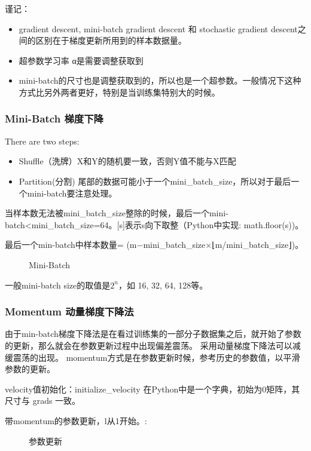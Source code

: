 \documentclass[UTF8]{ctexart}
\begin{document}
谨记：
\begin{itemize}
  \item gradient descent, mini-batch gradient descent 和 stochastic gradient descent之间的区别在于梯度更新所用到的样本数据量。
\item 超参数学习率 α是需要调整获取到
\item mini-batch的尺寸也是调整获取到的，所以也是一个超参数。一般情况下这种方式比另外两者更好，特别是当训练集特别大的时候。
\end{itemize}

\subsubsection{Mini-Batch 梯度下降}
There are two steps:
\begin{itemize}
  \item Shuffle（洗牌）X和Y的随机要一致，否则Y值不能与X匹配
  \item Partition(分割) 尾部的数据可能小于一个mini\_batch\_size，所以对于最后一个mini-batch要注意处理。
\end{itemize}

当样本数无法被mini\_batch\_size整除的时候，最后一个mini-batch<mini\_batch\_size=64。[s]表示s向下取整（Python中实现:
math.floor(s))。

最后一个min-batch中样本数量= (m−mini\_batch\_size×⌊m/mini\_batch\_size⌋)。
\begin{figure}[htb]
 \caption{Mini-Batch}
  \label{fig:29}
 \end{figure}

一般mini-batch size的取值是$2^n$，如 16, 32, 64, 128等。
\subsubsection{Momentum 动量梯度下降法}
由于min-batch梯度下降法是在看过训练集的一部分子数据集之后，就开始了参数的更新，那么就会在参数更新过程中出现偏差震荡。
采用动量梯度下降法可以减缓震荡的出现。
momentum方式是在参数更新时候，参考历史的参数值，以平滑参数的更新。

velocity值初始化：initialize\_velocity 在Python中是一个字典，初始为0矩阵，其尺寸与 grads 一致。

带momentum的参数更新，l从1开始。:
\begin{figure}[htb]
 \caption{参数更新}
  \label{fig:30}
 \end{figure}
\end{document}
